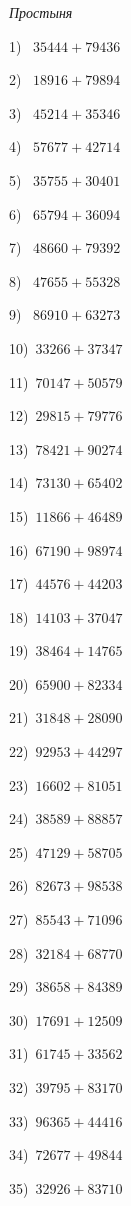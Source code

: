 \documentclass{article}
\begin{document}
 
\begin{center} 
   \large{\textit{Простыня}} 
\end{center}\begin{multicols}{2}
1)$\,\,\,\,\,35444+79436$ \par 
2)$\,\,\,\,\,18916+79894$ \par 
3)$\,\,\,\,\,45214+35346$ \par 
4)$\,\,\,\,\,57677+42714$ \par 
5)$\,\,\,\,\,35755+30401$ \par 
6)$\,\,\,\,\,65794+36094$ \par 
7)$\,\,\,\,\,48660+79392$ \par 
8)$\,\,\,\,\,47655+55328$ \par 
9)$\,\,\,\,\,86910+63273$ \par 
10)$\,\,\,33266+37347$ \par 
11)$\,\,\,70147+50579$ \par 
12)$\,\,\,29815+79776$ \par 
13)$\,\,\,78421+90274$ \par 
14)$\,\,\,73130+65402$ \par 
15)$\,\,\,11866+46489$ \par 
16)$\,\,\,67190+98974$ \par 
17)$\,\,\,44576+44203$ \par 
18)$\,\,\,14103+37047$ \par 
19)$\,\,\,38464+14765$ \par 
20)$\,\,\,65900+82334$ \par 
21)$\,\,\,31848+28090$ \par 
22)$\,\,\,92953+44297$ \par 
23)$\,\,\,16602+81051$ \par 
24)$\,\,\,38589+88857$ \par 
25)$\,\,\,47129+58705$ \par 
26)$\,\,\,82673+98538$ \par 
27)$\,\,\,85543+71096$ \par 
28)$\,\,\,32184+68770$ \par 
29)$\,\,\,38658+84389$ \par 
30)$\,\,\,17691+12509$ \par 
31)$\,\,\,61745+33562$ \par 
32)$\,\,\,39795+83170$ \par 
33)$\,\,\,96365+44416$ \par 
34)$\,\,\,72677+49844$ \par 
35)$\,\,\,32926+83710$ \par 

\end{multicols}
\end{document}
